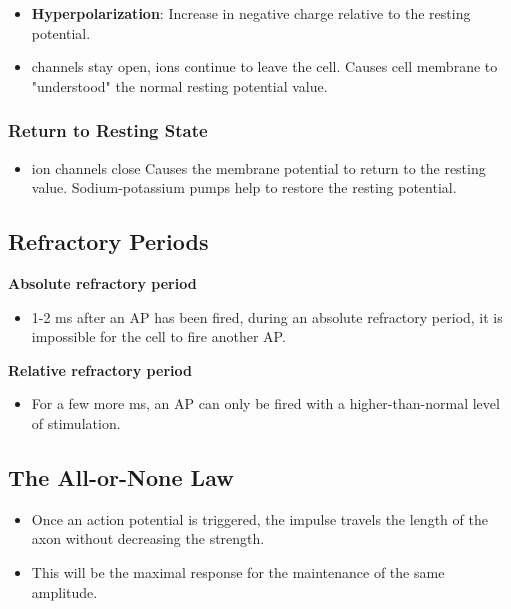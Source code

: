 \documentclass[12pt,a4paper]{article}
\begin{document}
	\begin{itemize}
		\item \textbf{Hyperpolarization}: Increase in negative charge relative to the resting potential. 
		\item {} channels stay open,  ions continue to leave the cell.
		\subitem Causes cell membrane to "understood" the normal resting potential value. 
	\end{itemize}
	
	\subsubsection{Return to Resting State}
	
	\begin{itemize}
		\item {} ion channels close
		\subitem Causes the membrane potential to return to the resting value. 
		\subitem Sodium-potassium pumps help to restore the resting potential. 
	\end{itemize}
	
	\subsection{Refractory Periods}
	
	\textbf{Absolute refractory period}
	
	\begin{itemize}
		\item 1-2 ms after an AP has been fired, during an absolute refractory period, it is impossible for the cell to fire another AP. 
	\end{itemize}
	
	\textbf{Relative refractory period}
	
	\begin{itemize}
		\item For a few more ms, an AP can only be fired with a higher-than-normal level of stimulation. 
	\end{itemize}
	
	\subsection{The All-or-None Law}
	
	\begin{itemize}
		\item Once an action potential is triggered, the impulse travels the length of the axon without decreasing the strength. 
		\item This will be the maximal response for the maintenance of the same amplitude. 
	\end{itemize}
	
\end{document}
